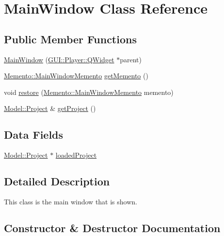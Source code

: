 \hypertarget{classGUI_1_1MainWindow}{}\section{Main\+Window Class Reference}
\label{classGUI_1_1MainWindow}
\subsection*{Public Member Functions}
\begin{DoxyCompactItemize}
\item 
\hyperlink{classGUI_1_1MainWindow_a6dcf16c443f94075bbc29f51512efec9}{Main\+Window} (\hyperlink{classGUI_1_1Player_1_1QWidget}{G\+U\+I\+::\+Player\+::\+Q\+Widget} $\ast$parent)
\item 
\hyperlink{classMemento_1_1MainWindowMemento}{Memento\+::\+Main\+Window\+Memento} \hyperlink{classGUI_1_1MainWindow_ae085d92d1c5bec057a813bd86bc20fa4}{get\+Memento} ()
\item 
void \hyperlink{classGUI_1_1MainWindow_a72db05f1394dbeeb2a76b74d8f65917b}{restore} (\hyperlink{classMemento_1_1MainWindowMemento}{Memento\+::\+Main\+Window\+Memento} memento)
\item 
\hyperlink{classModel_1_1Project}{Model\+::\+Project} \& \hyperlink{classGUI_1_1MainWindow_a0e9fe41bc141b89f4955329b959310eb}{get\+Project} ()
\end{DoxyCompactItemize}
\subsection*{Data Fields}
\begin{DoxyCompactItemize}
\item 
\hyperlink{classModel_1_1Project}{Model\+::\+Project} $\ast$ \hyperlink{classGUI_1_1MainWindow_a870e96d05ee2e8c616461952d01ac408}{loaded\+Project}
\end{DoxyCompactItemize}


\subsection{Detailed Description}
This class is the main window that is shown. 

\subsection{Constructor \& Destructor Documentation}
\hypertarget{classGUI_1_1MainWindow_a6dcf16c443f94075bbc29f51512efec9}{}
